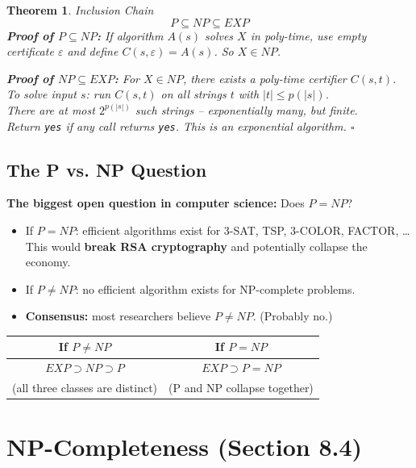\documentclass[12pt,a4paper]{report}
\newtheorem{theorem}{Theorem}
\begin{document}
\begin{theorem}{Inclusion Chain}{}
\[
P \subseteq NP \subseteq EXP
\]
\textbf{Proof of $P \subseteq NP$:} If algorithm $A(s)$ solves $X$ in poly-time, use empty certificate $\varepsilon$ and define $C(s, \varepsilon) = A(s)$. So $X \in NP$.

\textbf{Proof of $NP \subseteq EXP$:} For $X \in NP$, there exists a poly-time certifier $C(s,t)$.\\
To solve input $s$: run $C(s,t)$ on all strings $t$ with $|t| \leq p(|s|)$.\\
There are at most $2^{p(|s|)}$ such strings -- exponentially many, but finite.\\
Return \texttt{yes} if any call returns \texttt{yes}. This is an exponential algorithm. $\square$
\end{theorem}

\subsection{The P vs. NP Question}

\textbf{The biggest open question in computer science:} Does $P = NP$?

\begin{itemize}
    \item If \textbf{$P = NP$}: efficient algorithms exist for 3-SAT, TSP, 3-COLOR, FACTOR, \ldots\\ This would \textbf{break RSA cryptography} and potentially collapse the economy.
    \item If \textbf{$P \neq NP$}: no efficient algorithm exists for NP-complete problems.
    \item \textbf{Consensus:} most researchers believe $P \neq NP$. (Probably no.)
 
\end{itemize}

\begin{center}
\begin{tabular}{cc}
\toprule
\textbf{If $P \neq NP$} & \textbf{If $P = NP$} \\
\midrule
$EXP \supset NP \supset P$ & $EXP \supset P = NP$ \\
(all three classes are distinct) & (P and NP collapse together) \\
\bottomrule
\end{tabular}
\end{center}

\section{NP-Completeness (Section 8.4)}
\end{document}
